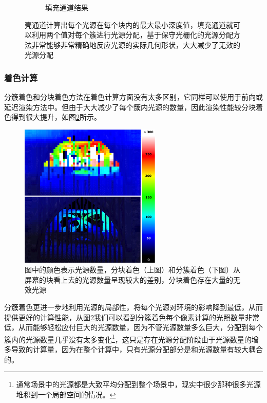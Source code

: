 \begin{figure}
\begin{center}
\begin{subfigure}[b]{0.49\textwidth}
		\caption{填充通道结果}
	\end{subfigure}
\end{center}
\caption{壳通道计算出每个光源在每个块内的最大最小深度值，填充通道就可以利用两个值对每个簇进行光源分配，基于保守光栅化的光源分配方法非常能够非常精确地反应光源的实际几何形状，大大减少了无效的光源分配}
\label{f:shade-fill-pass}
\end{figure}





\subsubsection{着色计算}
分簇着色和分块着色方法在着色计算方面没有太多区别，它同样可以使用于前向或延迟渲染方法中。但由于大大减少了每个簇内光源的数量，因此渲染性能较分块着色得到很大提升，如图\ref{f:shade-cluster-performance}所示。

\begin{figure}
	\sidecaption
	\includegraphics[width=0.6\textwidth]{figures/shade/cluster-performance}
	\caption{图中的颜色表示光源数量，分块着色（上图）和分簇着色（下图）从屏幕的块看上去的光源数量呈现较大的差别，分块着色存在大量的无效光源}
	\label{f:shade-cluster-performance}
\end{figure}

分簇着色更进一步地利用光源的局部性，将每个光源对环境的影响降到最低，从而提供更好的计算性能，从图\ref{f:shade-cluster-performance}我们可以看到分簇着色每个像素计算的光照数量非常低，从而能够轻松应付巨大的光源数量，因为不管光源数量多么巨大，分配到每个簇内的光源数量几乎没有太多变化\footnote{通常场景中的光源都是大致平均分配到整个场景中，现实中很少那种很多光源堆积到一个局部空间的情况。}，这只是存在光源分配阶段由于光源数量的增多导致的计算量，因为在整个计算中，只有光源分配部分是和光源数量有较大耦合的。

